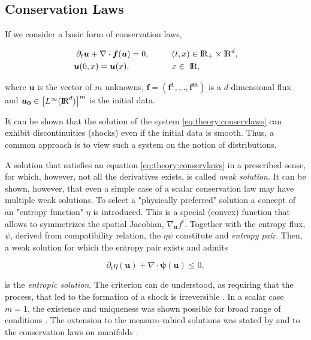 \documentclass[11pt,a4paper,headinclude=true,DIV=14,BCOR=8mm,chapterprefix,listof=totoc,twoside,openright,abstracton]{scrbook}
\begin{document}
\subsection{Conservation Laws}

If we consider a basic form of conservation laws, 

\begin{align} 
\partial_t\boldsymbol{u} + \nabla\cdot\boldsymbol{f}(\boldsymbol{u}) = 0, \hspace{10mm} &(t,x)\in \text{I\!R}_{+}\times\text{I\!R}^d , \\
\boldsymbol{u}(0, x) = \boldsymbol{u}(x), \hspace{18mm} &x\in \text{ I\!R},
\label{eq:theory:conservlaws}
\end{align}

where $\boldsymbol{u}$ is the vector of $m$ unknowns, $\boldsymbol{f}=(\boldsymbol{\boldsymbol{f}^1,...,\boldsymbol{f}^m})$ is a $d$-dimensional flux and $\boldsymbol{u_0}\in\big[L^{\infty}(\text{I\!R}^d)\big]^m$ is the initial data. 

It can be shown that the solution of the system \ref{eq:theory:conservlaws} can exhibit discontinuities (shocks) even if the initial data is smooth. Thus, a common approach is to view such a system on the notion of distributions. 

A solution that satisfies an equation \ref{eq:theory:conservlaws} in a prescribed sense, for which, however, not all the derivatives exists, is called \textit{weak solution}. It can be shown, however, that even a simple case of a scalar conservation law may have multiple weak solutions. To select a "physically preferred" solution a concept of an "entropy function" $\eta$ is introduced. This is a special (convex) function that allows to symmetrizes the spatial Jacobian, $\nabla_{\boldsymbol{u}}f^i$. Together with the entropy flux, $\psi$, derived from compatibility relation, the $\eta\psi$ constitute and \textit{entropy pair}. Then, a weak solution for which the entropy pair exists and admits

\begin{equation}
\partial_t\eta(\boldsymbol{u}) + \nabla\cdot\boldsymbol{\psi}(\boldsymbol{u})\leq 0,
\label{eq:theory:nummeth:entropic}
\end{equation}

is the \textit{entropic solution}. The criterion can de understood, as requiring that the process, that led to the formation of a shock is irreversible \cite{LeVeque:1992}. In a scalar case $m=1$, the existence and uniqueness was shown possible for broad range of conditions \cite{Kruzkov:1970}. The extension to the  measure-valued solutions was stated by \cite{DiPerna:1985} and to the conservation laws on manifolds \cite{Benartzi:2007}. 
\end{document}
